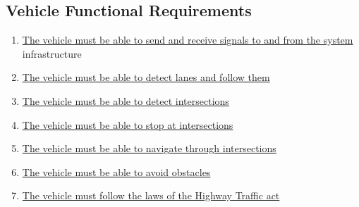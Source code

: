 \documentclass [11pt]{article}
\begin{document}
\subsection{Vehicle Functional Requirements}

\begin{enumerate}[label=\textbf{V\arabic*:}, ref =V\arabic*, leftmargin=0.7in]

	
	\item \label{V1}  \hyperref[sec:changeL]{The vehicle must be able to send and receive signals to and from the system} infrastructure %
	
	\item \label{V2} \hyperref[sec:changeL]{The vehicle must be able to detect lanes and follow them} %
    
    \item \label{V3} \hyperref[sec:changeL]{The vehicle must be able to detect intersections}  %
    
    \item \label{V4} \hyperref[sec:changeL]{The vehicle must be able to stop at intersections} %
    
    \item \label{V5} \hyperref[sec:changeL]{The vehicle must be able to navigate through intersections} %
    
    \item \label{V6} \hyperref[sec:changeL]{The vehicle must be able to avoid obstacles} %
    
    \item \label{V7} \hyperref[sec:changeL]{The vehicle must follow the laws of the Highway Traffic act} %
\end{enumerate}





\end{document}
